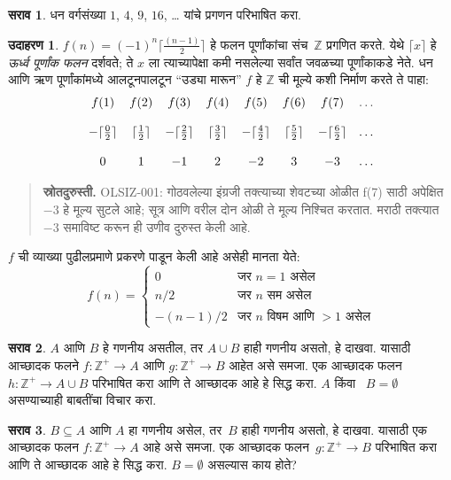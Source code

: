 \documentclass[11pt,a4paper,openany]{book}
\theoremstyle{definition}
\newtheorem{ex}[defn]{उदाहरण}
\newtheorem{prob}{सराव}[chapter]
\newcommand{\Int}{\mathbb{Z}}
\newcommand{\PosInt}{\mathbb{Z}^{+}}
\begin{document}
\begin{prob}
धन वर्गसंख्या $1$, $4$, $9$, $16$, \dots{} यांचे प्रगणन परिभाषित करा.
\end{prob}

\begin{ex}
$f(n) = (-1)^{n} \lceil \frac{(n-1)}{2}\rceil$ हे फलन पूर्णांकांचा
संच~$\Int$ प्रगणित करते. येथे $\lceil x \rceil$ हे
\emph{ऊर्ध्व पूर्णांक फलन} दर्शवते; ते $x$ ला त्याच्यापेक्षा कमी
नसलेल्या सर्वांत जवळच्या पूर्णांकाकडे नेते. धन आणि ऋण पूर्णांकांमध्ये
आलटूनपालटून ``उड्या मारून'' $f$ हे $\Int$ ची मूल्ये कशी निर्माण
करते ते पाहा:
\[
\begin{array}{c c c c c c c c}
f(1) & f(2) & f(3) & f(4) & f(5) & f(6) & f(7) & \dots \\ \\
- \lceil \tfrac{0}{2} \rceil & \lceil \tfrac{1}{2}\rceil & - \lceil \tfrac{2}{2} \rceil & \lceil \tfrac{3}{2} \rceil & - \lceil \tfrac{4}{2} \rceil  & \lceil \tfrac{5}{2}
\rceil & - \lceil \tfrac{6}{2} \rceil & \dots \\ \\
0 & 1 & -1 & 2 & -2 & 3 & -3 & \dots
\end{array}
\]
\begin{quote}\small\textbf{स्रोतदुरुस्ती.} OLSIZ-001: गोठवलेल्या इंग्रजी तक्त्याच्या शेवटच्या ओळीत f(7) साठी अपेक्षित −3 हे मूल्य सुटले आहे; सूत्र आणि वरील दोन ओळी ते मूल्य निश्चित करतात. मराठी तक्त्यात −3 समाविष्ट करून ही उणीव दुरुस्त केली आहे.\end{quote}
$f$ ची व्याख्या पुढीलप्रमाणे प्रकरणे पाडून केली आहे असेही मानता येते:
\[
f(n) = \begin{cases}
  0 & \text{जर $n = 1$ असेल}\\
  n/2 & \text{जर $n$ सम असेल}\\
  -(n-1)/2 & \text{जर $n$ विषम आणि $>1$ असेल}
  \end{cases}
\]
\end{ex}

\begin{prob}
  $A$ आणि $B$ हे गणनीय असतील, तर $A \cup B$ हाही
  गणनीय असतो, हे दाखवा. यासाठी आच्छादक फलने
  $f\colon \PosInt \to A$ आणि $g\colon \PosInt \to B$ आहेत असे
  समजा. एक आच्छादक फलन~$h\colon \PosInt \to A \cup B$
  परिभाषित करा आणि ते आच्छादक आहे हे सिद्ध करा. $A$ किंवा
  ~$B = \emptyset$ असण्याच्याही बाबतींचा विचार करा.
\end{prob}

\begin{prob}
  $B \subseteq A$ आणि $A$ हा गणनीय असेल, तर~$B$ हाही
  गणनीय असतो, हे दाखवा. यासाठी एक आच्छादक फलन
  $f\colon \PosInt \to A$ आहे असे समजा. एक आच्छादक
  फलन~$g\colon \PosInt \to B$ परिभाषित करा आणि ते
  आच्छादक आहे हे सिद्ध करा. $B = \emptyset$ असल्यास काय होते?
\end{prob}
\end{document}
